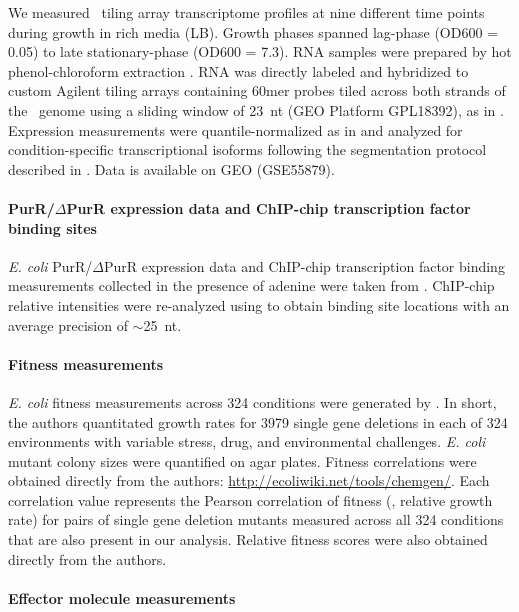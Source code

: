 We measured \eco\ tiling array transcriptome profiles at nine different time points during growth in rich media (LB). Growth phases spanned lag-phase (OD600 = 0.05) to late stationary-phase (OD600 = 7.3). RNA samples were prepared by hot phenol-chloroform extraction \cite{khodursky_escherichia_2003}. RNA was directly labeled and hybridized to custom Agilent tiling arrays containing 60mer probes tiled across both strands of the \eco\ genome using a sliding window of 23~nt (GEO Platform GPL18392), as in \cite{koide_prevalence_2009}. Expression measurements were quantile-normalized as in \cite{yoon_parallel_2011} and analyzed for condition-specific transcriptional isoforms following the segmentation protocol described in \cite{koide_prevalence_2009}. Data is available on GEO (GSE55879).

\paragraph{PurR/$\Delta$PurR expression data and ChIP-chip transcription factor binding sites} 

{\it E. coli} PurR/$\Delta$PurR expression data and ChIP-chip transcription factor binding measurements collected in the presence of adenine were taken from \cite{cho_purr_2011}. ChIP-chip relative intensities were re-analyzed using {} \cite{reiss_model-based_2008} to obtain binding site locations with an average precision of $\sim$25~nt.

\paragraph{Fitness measurements}
\label{section:fitness}

{\it E. coli} fitness measurements across 324 conditions were generated by \cite{nichols_phenotypic_2011}. In short, the authors quantitated growth rates for 3979 single gene deletions in each of 324 environments with variable stress, drug, and environmental challenges. \textit{E. coli} mutant colony sizes were quantified on agar plates.  Fitness correlations were obtained directly from the authors: \href{http://ecoliwiki.net/tools/chemgen/}{http://ecoliwiki.net/tools/chemgen/}. Each correlation value represents the Pearson correlation of fitness (\ie, relative growth rate) for pairs of single gene deletion mutants measured across all 324 conditions that are also present in our analysis. Relative fitness scores were also obtained directly from the authors.

\paragraph{Effector molecule measurements}

